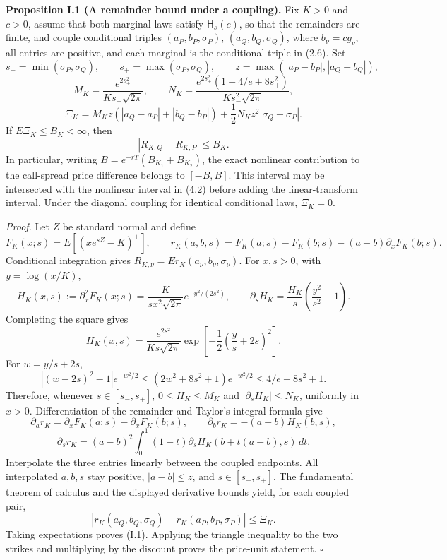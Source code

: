 \textbf{Proposition I.1 (A remainder bound under a coupling).}
Fix \(K>0\) and \(c>0\), assume that both marginal laws satisfy \(\mathsf H_s(c)\),
so that the remainders are finite, and couple conditional triples
\((a_P,b_P,\sigma_P)\), \((a_Q,b_Q,\sigma_Q)\), where
\(b_\nu=cg_\nu\), all entries are positive, and each marginal is the
conditional triple in (2.6). Set
\[
s_- =\min(\sigma_P,\sigma_Q),\qquad
s_+ =\max(\sigma_P,\sigma_Q),\qquad
z=\max(|a_P-b_P|,|a_Q-b_Q|),
\]
\[
M_K=\frac{e^{2s_+^2}}{K s_-\sqrt{2\pi}},\qquad
N_K=\frac{e^{2s_+^2}(1+4/e+8s_+^2)}{K s_-^2\sqrt{2\pi}},
\]
\[
\Xi_K=M_Kz\left(|a_Q-a_P|+|b_Q-b_P|\right)
       +\frac12N_Kz^2|\sigma_Q-\sigma_P|.
\]
If \(E\Xi_K\le B_K<\infty\), then
\[
|R_{K,Q}-R_{K,P}|\le B_K.                       \tag{I.1}
\]
In particular, writing \(B=e^{-rT}(B_{K_1}+B_{K_2})\), the exact nonlinear
contribution to the call-spread price difference belongs to
\([-B,B]\). This interval may be intersected with the nonlinear interval
in (4.2) before adding the linear-transform interval. Under the diagonal
coupling for identical conditional laws, \(\Xi_K=0\).

\textit{Proof.}
Let \(Z\) be standard normal and define
\[
F_K(x;s)=E[(xe^{sZ}-K)^+],\qquad
r_K(a,b,s)=F_K(a;s)-F_K(b;s)-(a-b)\partial_xF_K(b;s).
\]
Conditional integration gives \(R_{K,\nu}=E r_K(a_\nu,b_\nu,\sigma_\nu)\).
For \(x,s>0\), with \(y=\log(x/K)\),
\[
H_K(x,s):=\partial_x^2F_K(x;s)
=\frac{K}{s x^2\sqrt{2\pi}}e^{-y^2/(2s^2)},\qquad
\partial_sH_K=\frac{H_K}{s}\left(\frac{y^2}{s^2}-1\right).
\]
Completing the square gives
\[
H_K(x,s)=\frac{e^{2s^2}}{K s\sqrt{2\pi}}
\exp\left[-\frac12\left(\frac ys+2s\right)^2\right].
\]
For \(w=y/s+2s\),
\[
\left|(w-2s)^2-1\right|e^{-w^2/2}
\le(2w^2+8s^2+1)e^{-w^2/2}
\le 4/e+8s^2+1.
\]
Therefore, whenever \(s\in[s_-,s_+]\),
\(0\le H_K\le M_K\) and \(|\partial_sH_K|\le N_K\), uniformly in
\(x>0\). Differentiation of the remainder and Taylor's integral formula give
\[
\partial_a r_K=\partial_xF_K(a;s)-\partial_xF_K(b;s),\qquad
\partial_b r_K=-(a-b)H_K(b,s),
\]
\[
\partial_s r_K=(a-b)^2\int_0^1(1-t)
       \partial_sH_K(b+t(a-b),s)\,dt.
\]
Interpolate the three entries linearly between the coupled endpoints.
All interpolated \(a,b,s\) stay positive,
\(|a-b|\le z\), and \(s\in[s_-,s_+]\). The fundamental theorem of
calculus and the displayed derivative bounds yield, for each coupled pair,
\[
|r_K(a_Q,b_Q,\sigma_Q)-r_K(a_P,b_P,\sigma_P)|\le\Xi_K.
\]
Taking expectations proves (I.1). Applying the triangle inequality to the
two strikes and multiplying by the discount proves the price-unit statement.
\hfill\(\square\)

